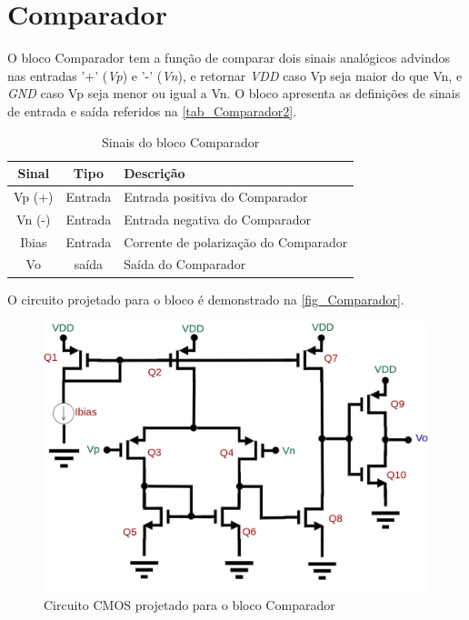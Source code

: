 \renewcommand{\NomeBloco}{Comparador}
\renewcommand{\NomePTab}{tab_\NomeBloco}
\renewcommand{\NomeSTab}{tab_\NomeBloco2}
\renewcommand{\NomePFig}{fig_\NomeBloco}
\renewcommand{\NomeSFig}{fig_\NomeBloco2}
\renewcommand{\NomeTTab}{tab_\NomeBloco3}

\section{\NomeBloco}

O bloco \NomeBloco{} tem a fun{\c c}\~ao de comparar dois sinais anal\'ogicos advindos nas entradas '+' (\emph{Vp}) e '-' (\emph{Vn}), e retornar \emph{VDD} caso Vp seja maior do que Vn, e \emph{GND} caso Vp seja menor ou igual a Vn.  O bloco apresenta as defini{\c c}\~oes de sinais de entrada e sa\'ida referidos na \autoref{\NomeSTab}.

\begin{table}[htbp]
\caption{Sinais do bloco \NomeBloco}
\label{\NomeSTab}
\centering
\begin{tabular}{ccl}

    \toprule
    Sinal & Tipo    & Descri{\c c}\~ao        \\
    \midrule \midrule
    Vp (+) & Entrada & Entrada positiva do Comparador\\
    \midrule
    Vn (-) & Entrada & Entrada negativa do Comparador\\
    \midrule
    Ibias & Entrada & Corrente de polariza{\c c}\~ao do Comparador\\
    \midrule
    Vo & sa\'ida & Sa\'ida do Comparador\\
    \bottomrule
\end{tabular}
\end{table}

O circuito projetado para o bloco \'e demonstrado na \autoref{\NomePFig}.

\begin{figure}[htb]
 \label{\NomePFig}
 \centering
    \centering
    \caption{Circuito CMOS projetado para o bloco \NomeBloco} 
    \includegraphics[scale=0.4]{Circuitos/Comparator.png}
\end{figure}

